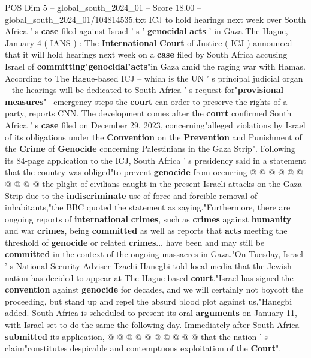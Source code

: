 \begin{textsample}{POS Dim 5 – global\_south\_2024\_01 – Score 18.00 – global\_south\_2024\_01/104814535.txt}  \label{ex:f5_pos_017}
ICJ to hold hearings next week over South Africa ' s \textbf{case} filed against Israel ' s ' \textbf{genocidal} \textbf{acts} ' in Gaza The Hague, January 4 ( IANS ) : The \textbf{International} \textbf{Court} of Justice ( ICJ ) announced that it will hold hearings next week on a \textbf{case} filed by South Africa accusing Israel of \textbf{committing}"\textbf{genocidal}"\textbf{acts}"in Gaza amid the raging war with Hamas.
According to The Hague-based ICJ -- which is the UN ' s principal judicial organ -- the hearings will be dedicated to South Africa ' s request for"\textbf{provisional} \textbf{measures}"-- emergency steps the \textbf{court} can order to preserve the rights of a party, reports CNN.
The development comes after the \textbf{court} confirmed South Africa ' s \textbf{case} filed on December 29, 2023, concerning"alleged violations by Israel of its obligations under the \textbf{Convention} on the \textbf{Prevention} and Punishment of the \textbf{Crime} of \textbf{Genocide} concerning Palestinians in the Gaza Strip".
Following its 84-page application to the ICJ, South Africa ' s presidency said in a statement that the country was obliged"to prevent \textbf{genocide} from occurring @ @ @ @ @ @ @ @ @ @ the plight of civilians caught in the present Israeli attacks on the Gaza Strip due to the \textbf{indiscriminate} use of force and forcible removal of inhabitants,"the BBC quoted the statement as saying."Furthermore, there are ongoing reports of \textbf{international} \textbf{crimes}, such as \textbf{crimes} against \textbf{humanity} and war \textbf{crimes}, being \textbf{committed} as well as reports that \textbf{acts} meeting the threshold of \textbf{genocide} or related \textbf{crimes}... have been and may still be \textbf{committed} in the context of the ongoing massacres in Gaza."On Tuesday, Israel ' s National Security Adviser Tzachi Hanegbi told local media that the Jewish nation has decided to appear at The Hague-based \textbf{court}."Israel has signed the \textbf{convention} against \textbf{genocide} for decades, and we will certainly not boycott the proceeding, but stand up and repel the absurd blood plot against us,"Hanegbi added.
South Africa is scheduled to present its oral \textbf{arguments} on January 11, with Israel set to do the same the following day.
Immediately after South Africa \textbf{submitted} its application, @ @ @ @ @ @ @ @ @ @ that the nation ' s claim"constitutes despicable and contemptuous exploitation of the \textbf{Court}".

\end{textsample}
